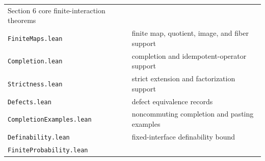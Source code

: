\documentclass[11pt]{article}
\theoremstyle{definition}
\begin{document}
\begin{longtable}[]{@{}ll@{}}
\begin{minipage}[t]{0.47\columnwidth}
Section 6 core finite-interaction theorems\strut
\end{minipage}\tabularnewline
\begin{minipage}[t]{0.47\columnwidth}\raggedright
\texttt{FiniteMaps.lean}\strut
\end{minipage} & \begin{minipage}[t]{0.47\columnwidth}\raggedright
finite map, quotient, image, and fiber support\strut
\end{minipage}\tabularnewline
\begin{minipage}[t]{0.47\columnwidth}\raggedright
\texttt{Completion.lean}\strut
\end{minipage} & \begin{minipage}[t]{0.47\columnwidth}\raggedright
completion and idempotent-operator support\strut
\end{minipage}\tabularnewline
\begin{minipage}[t]{0.47\columnwidth}\raggedright
\texttt{Strictness.lean}\strut
\end{minipage} & \begin{minipage}[t]{0.47\columnwidth}\raggedright
strict extension and factorization support\strut
\end{minipage}\tabularnewline
\begin{minipage}[t]{0.47\columnwidth}\raggedright
\texttt{Defects.lean}\strut
\end{minipage} & \begin{minipage}[t]{0.47\columnwidth}\raggedright
defect equivalence records\strut
\end{minipage}\tabularnewline
\begin{minipage}[t]{0.47\columnwidth}\raggedright
\texttt{CompletionExamples.lean}\strut
\end{minipage} & \begin{minipage}[t]{0.47\columnwidth}\raggedright
noncommuting completion and pasting examples\strut
\end{minipage}\tabularnewline
\begin{minipage}[t]{0.47\columnwidth}\raggedright
\texttt{Definability.lean}\strut
\end{minipage} & \begin{minipage}[t]{0.47\columnwidth}\raggedright
fixed-interface definability bound\strut
\end{minipage}\tabularnewline
\begin{minipage}[t]{0.47\columnwidth}\raggedright
\texttt{FiniteProbability.lean}\strut
\end{minipage} & \begin{minipage}[t]{0.47\columnwidth}\raggedright

\end{minipage}
\end{longtable}
\end{document}

